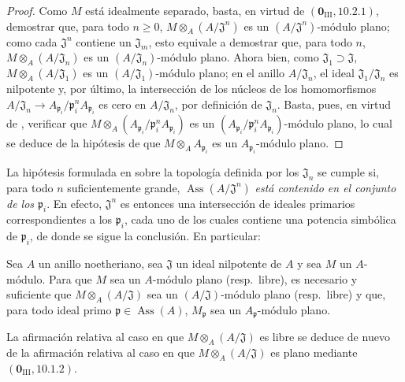 \begin{proof}
Como $M$ está idealmente separado, basta, en virtud de $(\mathbf 0_{\mathrm{III}},10.2.1)$, demostrar
que, para todo $n\geq0$, $M\otimes_A(A/\mathfrak J^n)$ es un $(A/\mathfrak J^n)$-módulo plano; como cada $\mathfrak J^n$ contiene
un $\mathfrak J_m$, esto equivale a demostrar que, para todo $n$, $M\otimes_A(A/\mathfrak J_n)$ es un $(A/\mathfrak J_n)$-módulo
plano. Ahora bien, como $\mathfrak J_1\supset\mathfrak J$, $M\otimes_A(A/\mathfrak J_1)$ es un $(A/\mathfrak J_1)$-módulo plano; en el anillo $A/\mathfrak J_n$,
el ideal $\mathfrak J_1/\mathfrak J_n$ es nilpotente y, por último, la intersección de los núcleos de los homomorfismos
$A/\mathfrak J_n\longrightarrow
A_{\mathfrak p_i}/\mathfrak p_i^nA_{\mathfrak p_i}$ es cero en $A/\mathfrak J_n$, por definición de $\mathfrak J_n$. Basta, pues, en virtud de ,
verificar que $M\otimes_A(A_{\mathfrak p_i}/\mathfrak p_i^nA_{\mathfrak p_i})$ es un $(A_{\mathfrak p_i}/\mathfrak p_i^nA_{\mathfrak p_i})$-módulo plano, lo cual se deduce de
la hipótesis de que $M\otimes_AA_{\mathfrak p_i}$ es un $A_{\mathfrak p_i}$-módulo plano.
\end{proof}

\begin{remark}[11.4.8]
\label{IV.11.4.8}
La hipótesis formulada en  sobre la topología definida
por los $\mathfrak J_n$ se cumple si, para todo $n$ suficientemente grande, $\operatorname{Ass}(A/\mathfrak J^n)$ \emph{está contenido en el conjunto
de los $\mathfrak p_i$}. En efecto, $\mathfrak J^n$ es entonces una intersección de ideales primarios correspondientes a los $\mathfrak p_i$, cada uno de los cuales
contiene una potencia simbólica de $\mathfrak p_i$, de donde se sigue la conclusión. En particular:
\end{remark}

\begin{corollary}[11.4.9]
\label{IV.11.4.9}
Sea $A$ un anillo noetheriano, sea $\mathfrak J$ un ideal nilpotente de $A$ y sea $M$ un
$A$-módulo. Para que $M$ sea un $A$-módulo plano \textup{(resp.}\ libre), es necesario y suficiente que $M\otimes_A(A/\mathfrak J)$
sea un $(A/\mathfrak J)$-módulo plano \textup{(resp.}\ libre) y que, para todo ideal primo $\mathfrak p\in\operatorname{Ass}(A)$, $M_\mathfrak p$ sea un
$A_\mathfrak p$-módulo plano.
\end{corollary}




La afirmación relativa al caso en que $M\otimes_A(A/\mathfrak J)$ es libre se deduce de nuevo de la afirmación relativa al caso en que $M\otimes_A(A/\mathfrak J)$ es plano mediante $(\mathbf 0_{\mathrm{III}},10.1.2)$.

